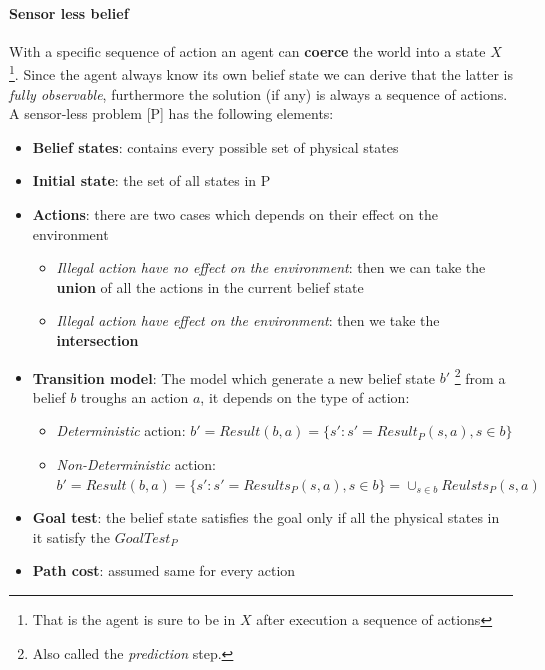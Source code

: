 \documentclass[5pt,a4paper]{article}
\begin{document}
\begin{itemize}
\paragraph{Sensor less belief} With a specific sequence of action an agent can \textbf{coerce} the world into a state $X$ \footnote{That is the agent is sure to be in $X$ after execution a sequence of actions}. Since the agent always know its own belief state we can derive that the latter is \textit{fully observable}, furthermore the solution (if any) is always a sequence of actions.\\
A sensor-less problem [P] has the following elements:
\begin{itemize}
\item \textbf{Belief states}: contains every possible set of physical states
\item \textbf{Initial state}: the set of all states in P
\item \textbf{Actions}: there are two cases which depends on their effect on the environment 
\begin{itemize}
\item \textit{Illegal action have no effect on the environment}: then we can take the \textbf{union} of all the actions in the current belief state
\item \textit{Illegal action have effect on the environment}: then we take the \textbf{intersection}
\end{itemize}


\item \textbf{Transition model}: The model which generate a new belief state $b'$ \footnote{Also called the \textit{prediction} step.}  from a belief $b$ troughs an action $a$, it depends on the type of action:

\begin{itemize}
\item \textit{Deterministic} action: $b'=Result(b,a)=\{s':s'=Result_P(s,a), s \in b\}$
\item \textit{Non-Deterministic} action: $b'=Result(b,a)=\{s':s'=Results_P(s,a), s \in b\}=\cup_{s\in b}Reulsts_P(s,a)$
\end{itemize}

\item \textbf{Goal test}: the belief state satisfies the goal only if all the physical states in it satisfy the $GoalTest_P$
\item \textbf{Path cost}: assumed same for every action
\end{itemize}


\end{itemize}
\end{document}
